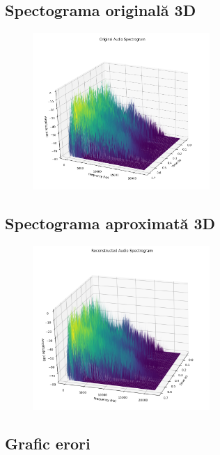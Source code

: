 \documentclass[12pt]{article}
\begin{document}
\subsection{Spectograma originală 3D}

\begin{figure}[h!]
    \centering
    \includegraphics[width=0.6\textwidth]{3dog.png}
\end{figure}

\subsection{Spectograma aproximată 3D}

\begin{figure}[h!]
    \centering
    \includegraphics[width=0.6\textwidth]{3dap.png}
\end{figure}

\subsection{Grafic erori}
\end{document}
